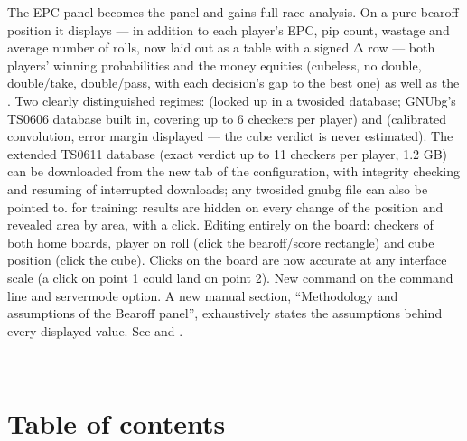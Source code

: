 \documentclass[letterpaper,10pt,english]{sphinxmanual}
\begin{document}
\begin{savenotes}
\begin{longtable}{}
\begin{varwidth}[t]{}
The EPC panel becomes the  panel and gains full race analysis. On a pure bearoff position it displays — in addition to each player’s EPC, pip count, wastage and average number of rolls, now laid out as a table with a signed Δ row — both players’ winning probabilities and the money equities (cubeless, no double, double/take, double/pass, with each decision’s gap to the best one) as well as the . Two clearly distinguished regimes:  (looked up in a two\sphinxhyphen{}sided database; GNUbg’s TS\sphinxhyphen{}06\sphinxhyphen{}06 database built in, covering up to 6 checkers per player) and  (calibrated convolution, error margin displayed — the cube verdict is never estimated). The extended TS\sphinxhyphen{}06\sphinxhyphen{}11 database (exact verdict up to 11 checkers per player, 1.2 GB) can be downloaded from the new  tab of the configuration, with integrity checking and resuming of interrupted downloads; any two\sphinxhyphen{}sided gnubg  file can also be pointed to.  for training: results are hidden on every change of the position and revealed area by area, with a click. Editing entirely on the board: checkers of both home boards, player on roll (click the bearoff/score rectangle) and cube position (click the cube). Clicks on the board are now accurate at any interface scale (a click on point 1 could land on point 2). New  command on the command line and  server\sphinxhyphen{}mode option. A new manual section, “Methodology and assumptions of the Bearoff panel”, exhaustively states the assumptions behind every displayed value. See {\hyperref[\detokenize{manuel:panneau-epc}]{}} and {\hyperref[\detokenize{manuel:epc-methodologie}]{}}.
\sphinxbeforeendvarwidth
\end{varwidth}%
\\
\sphinxbottomrule
\end{longtable}
\sphinxtableafterendhook
\sphinxatlongtableend
\end{savenotes}


\chapter{Table of contents}
\label{\detokenize{index:sommaire}}
\sphinxstepscope
\end{document}
